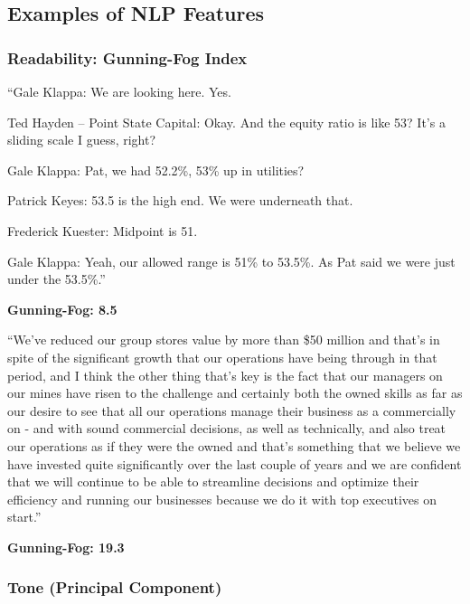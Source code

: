 \documentclass{article}[11pt]
\begin{document}
    \clearpage
    \newpage

    \subsection{Examples of NLP Features}

    \label{sec:nlp-examples}

    \subsubsection{Readability: Gunning-Fog Index}

    \begin{em}
        ``Gale Klappa: We are looking here. Yes.

        Ted Hayden – Point State Capital: Okay. And the equity ratio is like 53? It’s a sliding scale I guess, right?

        Gale Klappa: Pat, we had 52.2\%, 53\% up in utilities?
        
        Patrick Keyes: 53.5 is the high end. We were underneath that.
        
        Frederick Kuester: Midpoint is 51.
        
        Gale Klappa: Yeah, our allowed range is 51\% to 53.5\%. As Pat said we were just under the 53.5\%.''
    \end{em}

    \textbf{Gunning-Fog: 8.5}

    \begin{em}
        ``We've reduced our group stores value by more than \$50 million and that’s in spite of the significant growth that our operations have being through in that period, and I think the other thing that’s key is the fact that our managers on our mines have risen to the challenge and certainly both the owned skills as far as our desire to see that all our operations manage their business as a commercially on - and with sound commercial decisions, as well as technically, and also treat our operations as if they were the owned and that’s something that we believe we have invested quite significantly over the last couple of years and we are confident that we will continue to be able to streamline decisions and optimize their efficiency and running our businesses because we do it with top executives on start.''
    \end{em}

    \textbf{Gunning-Fog: 19.3}

    \subsubsection{Tone (Principal Component)}
\end{document}
